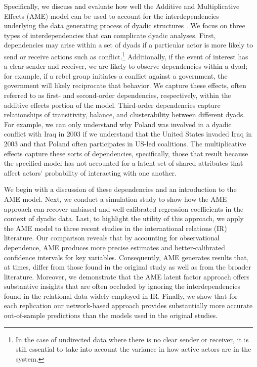 Specifically, we discuss and evaluate how well the Additive and Multiplicative Effects (AME) model can be used to account for the interdependencies underlying the data generating process of dyadic structures \citep{hoff:2005,hoff:2008,minhas:etal:2019}. We focus on three types of interdependencies that can complicate dyadic analyses. First, dependencies may arise within a set of dyads if a particular actor is more likely to send or receive actions such as conflict.\footnote{In the case of undirected data where there is no clear sender or receiver, it is still essential to take into account the variance in how active actors are in the system.} Additionally, if the event of interest has a clear sender and receiver, we are likely to observe dependencies within a dyad; for example, if a rebel group initiates a conflict against a government, the government will likely reciprocate that behavior. We capture these effects, often referred to as first- and second-order dependencies, respectively, within the additive effects portion of the model. Third-order dependencies capture relationships of transitivity, balance, and clusterability between different dyads. For example, we can only understand why Poland was involved in a dyadic conflict with Iraq in 2003 if we understand that the United States invaded Iraq in 2003 and that Poland often participates in US-led coalitions. The multiplicative effects capture these sorts of dependencies, specifically, those that result because the specified model has not accounted for a latent set of shared attributes that affect actors' probability of interacting with one another.

We begin with a discussion of these dependencies and an introduction to the AME model. Next, we conduct a simulation study to show how the AME approach can recover unbiased and well-calibrated regression coefficients in the context of dyadic data. Last, to highlight the utility of this approach, we apply the AME model to three recent studies in the international relations (IR) literature. Our comparison reveals that by accounting for observational dependence, AME produces more precise estimates and better-calibrated confidence intervals for key variables. Consequently, AME generates results that, at times, differ from those found in the original study as well as from the broader literature. Moreover, we demonstrate that the AME latent factor approach offers substantive insights that are often occluded by ignoring the interdependencies found in the relational data widely employed in IR. Finally, we show that for each replication our network-based approach provides substantially more accurate out-of-sample predictions than the models used in the original studies.

